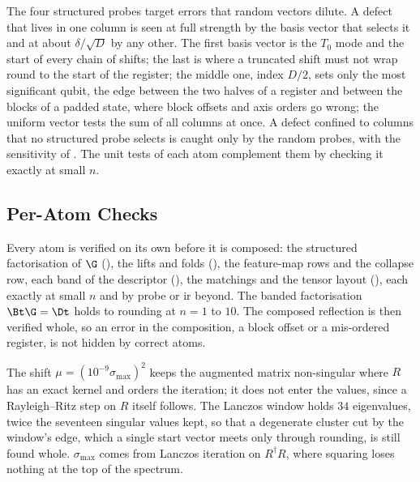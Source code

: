 The four structured probes target errors that random vectors dilute. A defect that lives in one column is seen at full strength by the basis vector that selects it and at about $\delta/\sqrt D$ by any other. The first basis vector is the $T_0$ mode and the start of every chain of shifts; the last is where a truncated shift must not wrap round to the start of the register; the middle one, index $D/2$, sets only the most significant qubit, the edge between the two halves of a register and between the blocks of a padded state, where block offsets and axis orders go wrong; the uniform vector tests the sum of all columns at once. A defect confined to columns that no structured probe selects is caught only by the random probes, with the sensitivity of . The unit tests of each atom complement them by checking it exactly at small $n$.

\subsection{Per-Atom Checks}
\label{app:atom-residuals}

Every atom is verified on its own before it is composed: the structured factorisation of $\G$ (), the lifts and folds (), the feature-map rows and the collapse row, each band of the descriptor (), the matchings and the tensor layout (), each exactly at small $n$ and by probe or \gls{ir} beyond. The banded factorisation $\Bt\G=\Dt$ holds to rounding at $n=1$ to $10$. The composed reflection is then verified whole, so an error in the composition, a block offset or a mis-ordered register, is not hidden by correct atoms.

The shift $\mu=(10^{-9}\sigma_{\max})^2$ keeps the augmented matrix non-singular where $R$ has an exact kernel and orders the iteration; it does not enter the values, since a Rayleigh--Ritz step on $R$ itself follows. The Lanczos window holds $34$ eigenvalues, twice the seventeen singular values kept, so that a degenerate cluster cut by the window's edge, which a single start vector meets only through rounding, is still found whole. $\sigma_{\max}$ comes from Lanczos iteration on $R^\dagger R$, where squaring loses nothing at the top of the spectrum.

